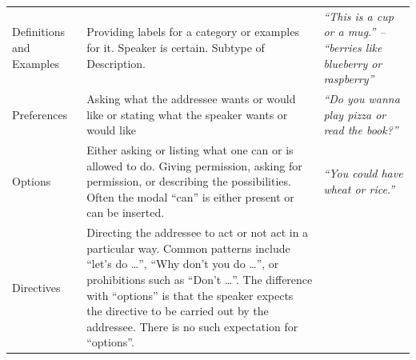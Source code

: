 \documentclass[,man,floatsintext]{apa6}
\begin{document}
\begin{longtable}[]{@{}lll@{}}
\begin{minipage}[t]{0.13\columnwidth}
Definitions and Examples\strut
\end{minipage} & \begin{minipage}[t]{0.45\columnwidth}\raggedright
Providing labels for a category or examples for it. Speaker is certain. Subtype of Description.\strut
\end{minipage} & \begin{minipage}[t]{0.33\columnwidth}\raggedright
\emph{\enquote{This is a cup or a mug.} -- \enquote{berries like blueberry or raspberry}}\strut
\end{minipage}\tabularnewline
\begin{minipage}[t]{0.13\columnwidth}\raggedright
Preferences\strut
\end{minipage} & \begin{minipage}[t]{0.45\columnwidth}\raggedright
Asking what the addressee wants or would like or stating what the speaker wants or would like\strut
\end{minipage} & \begin{minipage}[t]{0.33\columnwidth}\raggedright
\emph{\enquote{Do you wanna play pizza or read the book?}}\strut
\end{minipage}\tabularnewline
\begin{minipage}[t]{0.13\columnwidth}\raggedright
Options\strut
\end{minipage} & \begin{minipage}[t]{0.45\columnwidth}\raggedright
Either asking or listing what one can or is allowed to do. Giving permission, asking for permission, or describing the possibilities. Often the modal \enquote{can} is either present or can be inserted.\strut
\end{minipage} & \begin{minipage}[t]{0.33\columnwidth}\raggedright
\emph{\enquote{You could have wheat or rice.}}\strut
\end{minipage}\tabularnewline
\begin{minipage}[t]{0.13\columnwidth}\raggedright
Directives\strut
\end{minipage} & \begin{minipage}[t]{0.45\columnwidth}\raggedright
Directing the addressee to act or not act in a particular way. Common patterns include \enquote{let's do \ldots{}}, \enquote{Why don't you do \ldots{}}, or prohibitions such as \enquote{Don't \ldots{}}. The difference with \enquote{options} is that the speaker expects the directive to be carried out by the addressee. There is no such expectation for \enquote{options}.\strut
\end{minipage} & \begin{minipage}[t]{0.33\columnwidth}\raggedright

\end{minipage}
\end{longtable}
\end{document}
